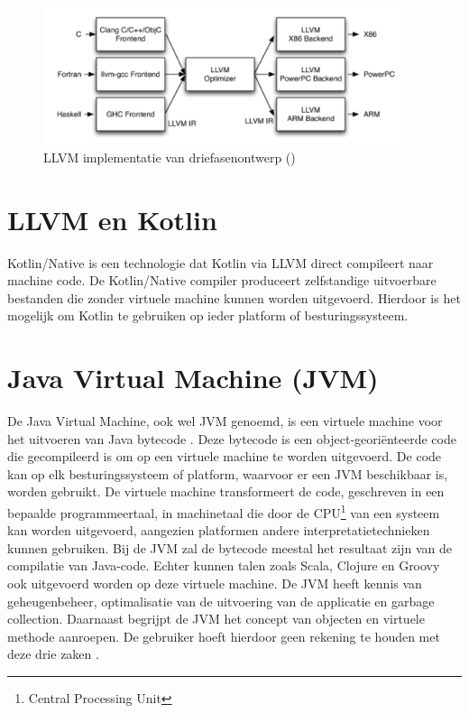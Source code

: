 \begin{figure} [ht]
	\centering
	\includegraphics[width=0.95\textwidth]{img/llvmirdriefasen}
	\caption{LLVM implementatie van driefasenontwerp (\cite{aosa})}
	\label{fig:llvmirdriefasen}
\end{figure}

\section{LLVM en Kotlin}
Kotlin/Native is een technologie dat Kotlin via LLVM direct compileert naar machine code. De Kotlin/Native compiler produceert zelfstandige uitvoerbare bestanden die zonder virtuele machine kunnen worden uitgevoerd. Hierdoor is het mogelijk om Kotlin te gebruiken op ieder platform of besturingssysteem.

\section{Java Virtual Machine (JVM)}
\label{sec:jvm}
De Java Virtual Machine, ook wel JVM genoemd, is een virtuele machine voor het uitvoeren van Java bytecode \autocite{TechopediaBytecode}. Deze bytecode is een object-georiënteerde code die gecompileerd is om op een virtuele machine te worden uitgevoerd. De code kan op elk besturingssysteem of platform, waarvoor er een JVM beschikbaar is, worden gebruikt. De virtuele machine transformeert de code, geschreven in een bepaalde programmeertaal, in machinetaal die door de CPU\footnote{Central Processing Unit} van een systeem kan worden uitgevoerd, aangezien platformen andere interpretatietechnieken kunnen gebruiken. Bij de JVM zal de bytecode meestal het resultaat zijn van de compilatie van Java-code. Echter kunnen talen zoals Scala, Clojure en Groovy ook uitgevoerd worden op deze virtuele machine. De JVM heeft kennis van geheugenbeheer, optimalisatie van de uitvoering van de applicatie en garbage collection. Daarnaast begrijpt de JVM het concept van objecten en virtuele methode aanroepen. De gebruiker hoeft hierdoor geen rekening te houden met deze drie zaken \autocite{TechopediaJVM}. 

